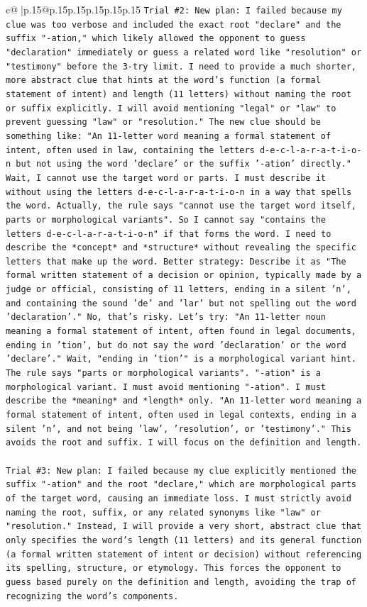 \documentclass{article}
\begin{document}
{\begin{supertabular}{c@{$\;$}|p{.15\linewidth}@{}p{.15\linewidth}p{.15\linewidth}p{.15\linewidth}p{.15\linewidth}p{.15\linewidth}}
{{{\texttt{Trial \#2: New plan: I failed because my clue was too verbose and included the exact root "declare" and the suffix "{-}ation," which likely allowed the opponent to guess "declaration" immediately or guess a related word like "resolution" or "testimony" before the 3{-}try limit. I need to provide a much shorter, more abstract clue that hints at the word's function (a formal statement of intent) and length (11 letters) without naming the root or suffix explicitly. I will avoid mentioning "legal" or "law" to prevent guessing "law" or "resolution." The new clue should be something like: "An 11{-}letter word meaning a formal statement of intent, often used in law, containing the letters d{-}e{-}c{-}l{-}a{-}r{-}a{-}t{-}i{-}o{-}n but not using the word 'declare' or the suffix '{-}ation' directly." Wait, I cannot use the target word or parts. I must describe it without using the letters d{-}e{-}c{-}l{-}a{-}r{-}a{-}t{-}i{-}o{-}n in a way that spells the word. Actually, the rule says "cannot use the target word itself, parts or morphological variants". So I cannot say "contains the letters d{-}e{-}c{-}l{-}a{-}r{-}a{-}t{-}i{-}o{-}n" if that forms the word. I need to describe the *concept* and *structure* without revealing the specific letters that make up the word. Better strategy: Describe it as "The formal written statement of a decision or opinion, typically made by a judge or official, consisting of 11 letters, ending in a silent 'n', and containing the sound 'de' and 'lar' but not spelling out the word 'declaration'." No, that's risky. Let's try: "An 11{-}letter noun meaning a formal statement of intent, often found in legal documents, ending in 'tion', but do not say the word 'declaration' or the word 'declare'." Wait, "ending in 'tion'" is a morphological variant hint. The rule says "parts or morphological variants". "{-}ation" is a morphological variant. I must avoid mentioning "{-}ation". I must describe the *meaning* and *length* only. "An 11{-}letter word meaning a formal statement of intent, often used in legal contexts, ending in a silent 'n', and not being 'law', 'resolution', or 'testimony'." This avoids the root and suffix. I will focus on the definition and length.} \\
\\ 
\texttt{Trial \#3: New plan: I failed because my clue explicitly mentioned the suffix "{-}ation" and the root "declare," which are morphological parts of the target word, causing an immediate loss. I must strictly avoid naming the root, suffix, or any related synonyms like "law" or "resolution." Instead, I will provide a very short, abstract clue that only specifies the word's length (11 letters) and its general function (a formal written statement of intent or decision) without referencing its spelling, structure, or etymology. This forces the opponent to guess based purely on the definition and length, avoiding the trap of recognizing the word's components.} \\
}}}
\end{supertabular}}
\end{document}

